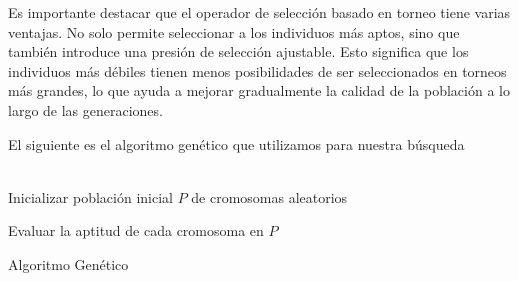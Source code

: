 Es importante destacar que el operador de selección basado en torneo tiene varias ventajas. No solo permite seleccionar a los individuos más aptos, sino que también introduce una presión de selección ajustable. Esto significa que los individuos más débiles tienen menos posibilidades de ser seleccionados en torneos más grandes, lo que ayuda a mejorar gradualmente la calidad de la población a lo largo de las generaciones.


El siguiente es el algoritmo genético que utilizamos para nuestra búsqueda
\\
\\
\begin{algorithm}[H]

\SetAlgoLined
{}
Inicializar población inicial $P$ de cromosomas aleatorios\;

Evaluar la aptitud de cada cromosoma en $P$\;

\caption{Algoritmo Genético}
\end{algorithm}

